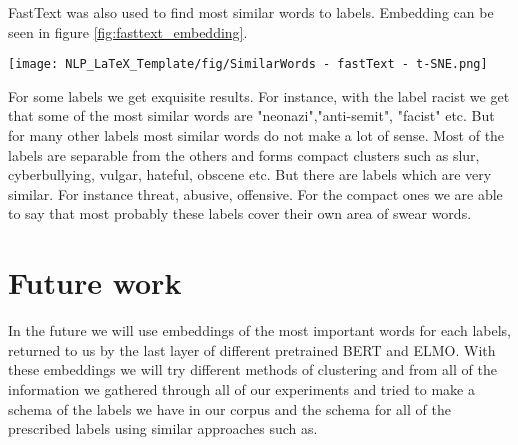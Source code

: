 \documentclass[fleqn,moreauthors,10pt]{ds_report}
\begin{document}
FastText was also used to find most similar words to labels. Embedding can be seen in figure \ref{fig:fasttext_embedding}.
\begin{figure*}
    \centering
    \texttt{[image: NLP\_LaTeX\_Template/fig/SimilarWords - fastText - t-SNE.png]}
    \caption{Most similar words retrieved by fastText.}
    \label{fig:fasttext_embedding}
\end{figure*}
For some labels we get exquisite results. For instance, with the label racist we get that some of the most similar words are "neonazi","anti-semit", "facist" etc. But for many other labels most similar words do not make a lot of sense. Most of the labels are separable from the others and forms compact clusters such as slur, cyberbullying, vulgar, hateful, obscene etc. But there are labels which are very similar. For instance threat, abusive, offensive. For the compact ones we are able to say that most probably these labels cover their own area of swear words.

\section*{Future work}
In the future we will use embeddings of the most important words for each labels, returned to us by the last layer of different pretrained BERT\cite{bert-toxccin, hasoc2020} and ELMO\cite{ElmoSemEval}. With these embeddings we will try different methods of clustering and from all of the information we gathered through all of our experiments and tried to make a schema of the labels \cite{latentDirichtlet, lda2} we have in our corpus and the schema for all of the prescribed labels using similar approaches such as.





\end{document}
